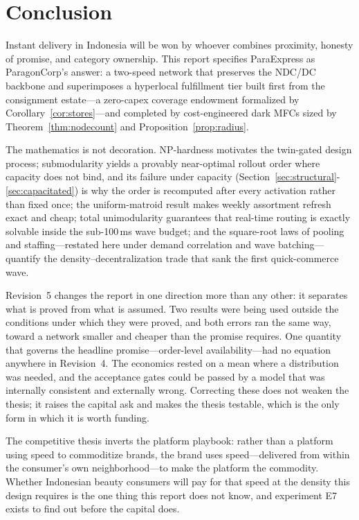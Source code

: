 \section{Conclusion}

Instant delivery in Indonesia will be won by whoever combines proximity, honesty of promise, and category ownership. This report specifies ParaExpress as ParagonCorp's answer: a two-speed network that preserves the NDC/DC backbone and superimposes a hyperlocal fulfillment tier built first from the consignment estate---a zero-capex coverage endowment formalized by Corollary~\ref{cor:stores}---and completed by cost-engineered dark MFCs sized by Theorem~\ref{thm:nodecount} and Proposition~\ref{prop:radius}.

The mathematics is not decoration. NP-hardness motivates the twin-gated design process; submodularity yields a provably near-optimal rollout order where capacity does not bind, and its failure under capacity (Section~\ref{sec:structural}-\ref{sec:capacitated}) is why the order is recomputed after every activation rather than fixed once; the uniform-matroid result makes weekly assortment refresh exact and cheap; total unimodularity guarantees that real-time routing is exactly solvable inside the sub-100\,ms wave budget; and the square-root laws of pooling and staffing---restated here under demand correlation and wave batching---quantify the density--decentralization trade that sank the first quick-commerce wave.

Revision~5 changes the report in one direction more than any other: it separates what is proved from what is assumed. Two results were being used outside the conditions under which they were proved, and both errors ran the same way, toward a network smaller and cheaper than the promise requires. One quantity that governs the headline promise---order-level availability---had no equation anywhere in Revision~4. The economics rested on a mean where a distribution was needed, and the acceptance gates could be passed by a model that was internally consistent and externally wrong. Correcting these does not weaken the thesis; it raises the capital ask and makes the thesis testable, which is the only form in which it is worth funding.

The competitive thesis inverts the platform playbook: rather than a platform using speed to commoditize brands, the brand uses speed---delivered from within the consumer's own neighborhood---to make the platform the commodity. Whether Indonesian beauty consumers will pay for that speed at the density this design requires is the one thing this report does not know, and experiment E7 exists to find out before the capital does.

